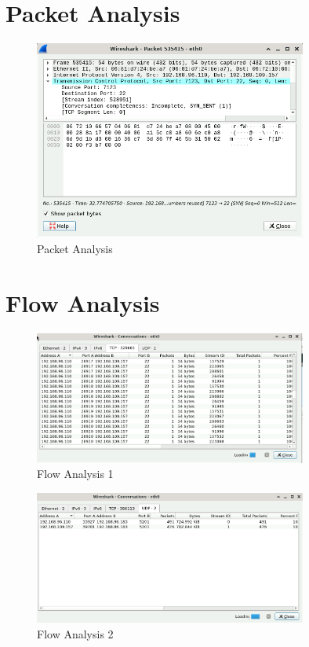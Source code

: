 \section{Packet Analysis}

\begin{figure}[H]
\centering
\includegraphics[width=0.8\textwidth]{img/level3/level3-packet-analysis.png}
\caption{Packet Analysis}\label{fig:PacketAnalysis}
\end{figure}

\section{Flow Analysis}

\begin{figure}[H]
\centering
\includegraphics[width=0.8\textwidth]{img/level3/level3-flow-analysis1.png}
\caption{Flow Analysis 1}\label{fig:FlowAnalysis1}
\end{figure}

\begin{figure}[H]
\centering
\includegraphics[width=0.8\textwidth]{img/level3/level3-flow-analysis2.png}
\caption{Flow Analysis 2}\label{fig:FlowAnalysis2}
\end{figure}
